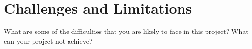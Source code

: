 \section{Challenges and Limitations}
What are some of the difficulties that you are likely to face in this project? What can your project not achieve?
